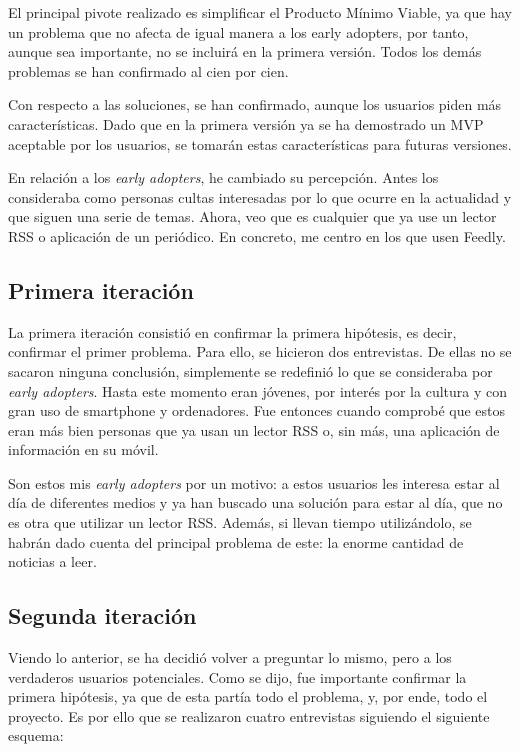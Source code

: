 El principal pivote realizado es simplificar el Producto Mínimo Viable, ya que hay un problema que no afecta de igual manera a los early adopters, por tanto, aunque sea importante, no se incluirá en la primera versión. Todos los demás problemas se han confirmado al cien por cien.

Con respecto a las soluciones, se han confirmado, aunque los usuarios piden más características. Dado que en la primera versión ya se ha demostrado un MVP aceptable por los usuarios, se tomarán estas características para futuras versiones.

En relación a los \textit{early adopters}, he cambiado su percepción. Antes los consideraba como personas cultas interesadas por lo que ocurre en la actualidad y que siguen una serie de temas. Ahora, veo que es cualquier que ya use un lector RSS o aplicación de un periódico. En concreto, me centro en los que usen Feedly.

\subsection{Primera iteración}

La primera iteración consistió en confirmar la primera hipótesis, es decir, confirmar el primer problema. Para ello, se hicieron dos entrevistas. De ellas no se sacaron ninguna conclusión, simplemente se redefinió lo que se consideraba por \textit{early adopters}. Hasta este momento eran jóvenes, por interés por la cultura y con gran uso de smartphone y ordenadores. Fue entonces cuando comprobé que estos eran más bien personas que ya usan un lector RSS o, sin más, una aplicación de información en su móvil.

Son estos mis \textit{early adopters} por un motivo: a estos usuarios les interesa estar al día de diferentes medios y ya han buscado una solución para estar al día, que no es otra que utilizar un lector RSS. Además, si llevan tiempo utilizándolo, se habrán dado cuenta del principal problema de este: la enorme cantidad de noticias a leer.


\subsection{Segunda iteración}

Viendo lo anterior, se ha decidió volver a preguntar lo mismo, pero a los verdaderos usuarios potenciales. Como se dijo, fue importante confirmar la primera hipótesis, ya que de esta partía todo el problema, y, por ende, todo el proyecto. Es por ello que se realizaron cuatro entrevistas siguiendo el siguiente esquema:

